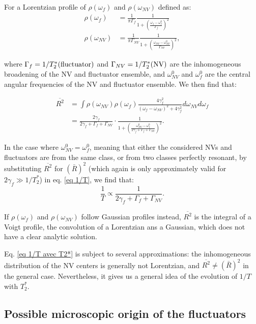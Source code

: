 \documentclass[a4paper,11pt]{report}
\begin{document}
For a Lorentzian profile of $\rho(\omega_{f})$ and $\rho(\omega_{NV})$ defined as:
\begin{align*}
\rho(\omega_{f})&=\frac{1}{\pi \Gamma_f} \frac{1}{1+ \left(\frac{\omega_f-\omega^0_f}{\Gamma_f}\right)^2} \\
\rho(\omega_{NV})&=\frac{1}{\pi \Gamma_{NV}} \frac{1}{1+ \left(\frac{\omega_{NV}-\omega^0_{NV}}{\Gamma_{NV}}\right)^2},
\end{align*}

where $\Gamma_{f}=1/T_2^*(\rm fluctuator)$ and $\Gamma_{NV}=1/T_2^*(\rm NV)$ are the inhomogeneous broadening of the NV and fluctuator ensemble, and $\omega^0_{NV}$ and $\omega^0_{f}$ are the central angular frequencies of the NV and fluctuator ensemble. We then find that:

\begin{align*}
\overline{R^2}&= \int \rho(\omega_{NV}) \rho(\omega_{f}) \frac{4\gamma_f^2}{(\omega_f - \omega_{NV})^2+4\gamma_f^2} d\omega_{NV} d\omega_{f} \\
&=\frac{2 \gamma_f}{2 \gamma_f + \Gamma_f + \Gamma_{NV}} \cdot \frac{1}{1+\left(\frac{\omega^0_{NV}-\omega^0_{f}}{2 \gamma_f + \Gamma_f + \Gamma_{NV}}\right)^2}.
\end{align*}

In the case where $\omega^0_{NV}=\omega^0_{f}$, meaning that either the considered NVs and fluctuators are from the same class, or from two classes perfectly resonant, by substituting $\overline{R ^2}$ for $(\bar{R})^2$ (which again is only approximately valid for $2 \gamma_f \gg 1/T_2^*$) in eq. \ref{eq 1/T}, we find that:
\begin{equation}
\label{eq 1/T avec T2*}
\frac{1}{T} \propto \frac{1}{2\gamma_f + \Gamma_f + \Gamma_{NV}}.
\end{equation}

If $\rho(\omega_{f})$ and $\rho(\omega_{NV})$ follow Gaussian profiles instead, $\overline{R^2}$ is the integral of a Voigt profile, the convolution of a Lorentzian ans a Gaussian, which does not have a clear analytic solution.

Eq. \ref{eq 1/T avec T2*} is subject to several approximations: the inhomogeneous distribution of the NV centers is generally not Lorentzian, and $\overline{R^2} \neq (\bar{R})^2$ in the general case. Nevertheless, it gives us a general idea of the evolution of $1/T$ with $T_2^*$.

 \subsection{Possible microscopic origin of the fluctuators}
\end{document}
